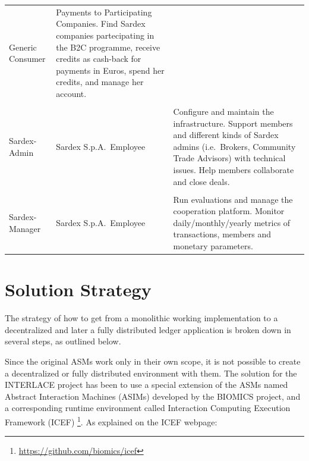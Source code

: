 {\begin{longtable}[]{@{}lll@{}}
\begin{minipage}[t]{0.25\columnwidth}Generic Consumer \end{minipage} &
\begin{minipage}[t]{0.45\columnwidth}Payments to Participating Companies. Find Sardex companies partecipating in the B2C programme, receive credits as cash-back for payments in Euros, spend her credits, and manage her account.\end{minipage}
\tabularnewline
\tabularnewline
\begin{minipage}[t]{0.18\columnwidth}Sardex-Admin \end{minipage} &
\begin{minipage}[t]{0.25\columnwidth}Sardex S.p.A.\ Employee \end{minipage} &
\begin{minipage}[t]{0.45\columnwidth}Configure and maintain the infrastructure. Support members and different kinds of Sardex admins (i.e.\ Brokers, Community Trade Advisors) with technical issues. Help members collaborate and close deals.\end{minipage}
\tabularnewline
\tabularnewline
\begin{minipage}[t]{0.18\columnwidth}Sardex-Manager \end{minipage} &
\begin{minipage}[t]{0.25\columnwidth}Sardex S.p.A.\ Employee \end{minipage} &
\begin{minipage}[t]{0.45\columnwidth}Run evaluations and manage the cooperation platform. Monitor daily/monthly/yearly metrics of transactions, members and monetary parameters. \end{minipage}
\tabularnewline
\bottomrule
\end{longtable}
}

\section{Solution Strategy}\label{section-solution-strategy}
The strategy of how to get from a monolithic working implementation to a decentralized and later a fully distributed ledger application is broken down in several steps, as outlined below.

Since the original ASMs work only in their own scope, it is not possible to create a decentralized or fully distributed environment with them. The solution for the INTERLACE project has been to use a special extension of the ASMs named Abstract Interaction Machines (ASIMs) developed by the BIOMICS project, and a corresponding runtime environment called Interaction Computing Execution Framework (ICEF) \footnote{\url{https://github.com/biomics/icef}}. As explained on the ICEF webpage:

